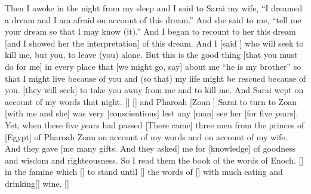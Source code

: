 \begin{translation}
    Then I awoke in the night from my sleep and I said to Sarai my wife, ``I dreamed
    a dream and I am afraid on account of this dream.'' And she said to me, ``tell me your dream so that I may know (it).'' And I began to recount to her this dream 
    [and I showed her the interpretation] of this dream. And I [said \hspace*{1em}] who will seek to kill me, but you, to leave (you) alone. But this is the good thing 
    [that you must do for me] in every place that [we might go, say] about me ``he is my brother'' so that I might live because of you and (so that) my life might be rescued because of you. 
    [they will seek] to take you away from me and to kill me. And Sarai wept on account of my words that night.
    [\hspace*{1em}] [\hspace*{1em}] and Pharoah [Zoan \hspace{1em}] Sarai to turn to Zoan
    [with me and she] was very [conscientious] lest any [man] see her [for five years]. Yet, when these five years had passed
    [There came] three men from the princes of [Egypt] of Pharoah Zoan on account of my words and on account of my wife. And they gave
    [me many gifts. And they asked] me for [knowledge] of goodness and wisdom and righteousness. So I read them the book of the words of Enoch.
    [\hspace*{1em}] in the famine which [\hspace*{1em}] to stand until [\hspace*{1em}] the words of
    [\hspace*{1em}] with much eating and drinking[\hspace*{1em}] wine.
    [\hspace*{1em}]
\end{translation}